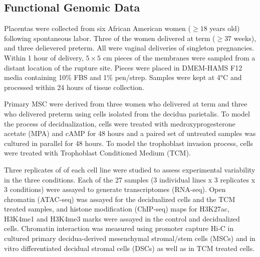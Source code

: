 \subsection{Functional Genomic Data}\label{sec:org702e301}
  
Placentas were collected from six African American women (\(\geq 18\) years old) following spontaneous labor.
Three of the women delivered at term (\(\geq 37\) weeks), and three delievered preterm.
All were vaginal deliveries of singleton pregnancies. Within 1 hour of delivery, $5 \times 5$ cm pieces of the membranes were
sampled from a distant location of the rupture site. Pieces were placed in DMEM-HAMS F12 media containing 10\% FBS and
1\% pen/strep. Samples were kept at 4°C and processed within 24 hours of tissue collection.

Primary MSC were derived from three women who delivered at term and three who delivered preterm using cells isolated from the decidua parietalis.
To model the process of decidualization, cells were treated with medroxyprogesterone acetate (MPA)
and cAMP for 48 hours and a paired set of untreated samples was cultured in parallel for 48 hours.
To model the trophoblast invasion process, cells were treated with Trophoblast Conditioned Medium (TCM).

Three replicates of of each cell line were studied to assess experimental variability in the three conditions.
Each of the 27 samples (3 individual lines x 3 replicates x 3 conditions) were assayed to generate transcriptomes (RNA-seq).
Open chromatin (ATAC-seq) was assayed for the decidualized cells and the TCM treated samples,
and histone modification (ChIP-seq) maps for H3K27ac, H3K4me1 and H3K4me3 marks were assayed in the control and decidualized cells.
Chromatin interaction was measured using promoter capture Hi-C in cultured primary decidua-derived mesenchymal stromal/stem cells (MSCs)
and in vitro differentiated decidual stromal cells (DSCs) as well as in TCM treated cells.






